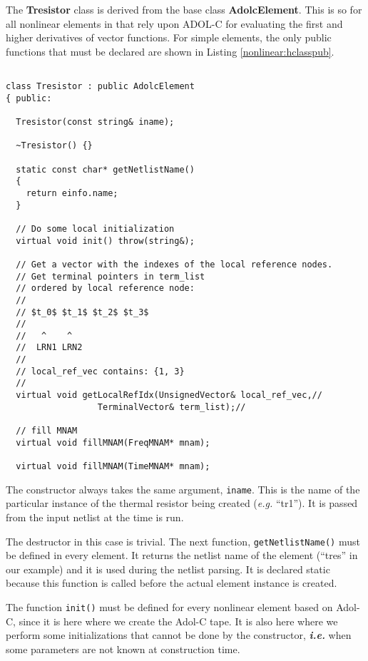The \textbf{Tresistor} class is derived from the base class
\textbf{AdolcElement}. This is so for all nonlinear elements in
\FDA that rely upon ADOL-C for evaluating the first and higher
derivatives of vector functions. For simple elements, the only
public functions that must be declared are shown in Listing
\ref{nonlinear:hclasspub}.

\begin{lstlisting}[firstnumber=24, label={nonlinear:hclasspub},
    caption={Class declaration and public functions of Tresistor.h}]

class Tresistor : public AdolcElement
{ public:

  Tresistor(const string& iname);

  ~Tresistor() {}

  static const char* getNetlistName()
  {
    return einfo.name;
  }

  // Do some local initialization
  virtual void init() throw(string&);

  // Get a vector with the indexes of the local reference nodes.
  // Get terminal pointers in term_list
  // ordered by local reference node:
  //
  // $t_0$ $t_1$ $t_2$ $t_3$
  //
  //   ^    ^
  //  LRN1 LRN2
  //
  // local_ref_vec contains: {1, 3}
  //
  virtual void getLocalRefIdx(UnsignedVector& local_ref_vec,//
                  TerminalVector& term_list);//

  // fill MNAM
  virtual void fillMNAM(FreqMNAM* mnam);

  virtual void fillMNAM(TimeMNAM* mnam);

\end{lstlisting}

The constructor always takes the same argument, \texttt{iname}. This
is the name of the particular instance of the thermal resistor being created
(\emph{e.g.} ``tr1'').  It is passed from the input netlist at the time
\FDA is run.

The destructor in this case is trivial. The next function,
\texttt{getNetlistName()} must be defined in every \FDA element.
It returns the netlist name of the element (``tres'' in our
example) and it is used during the netlist parsing. It is declared
static because this function is called before the actual element
instance is created.

The function \texttt{init()} must be defined for every nonlinear
element based on Adol-C, since it is here where we create the
Adol-C tape. It is also here where we perform some initializations
that cannot be done by the constructor, \textit{\textbf{i.e.}}
when some parameters are not known at construction time.

